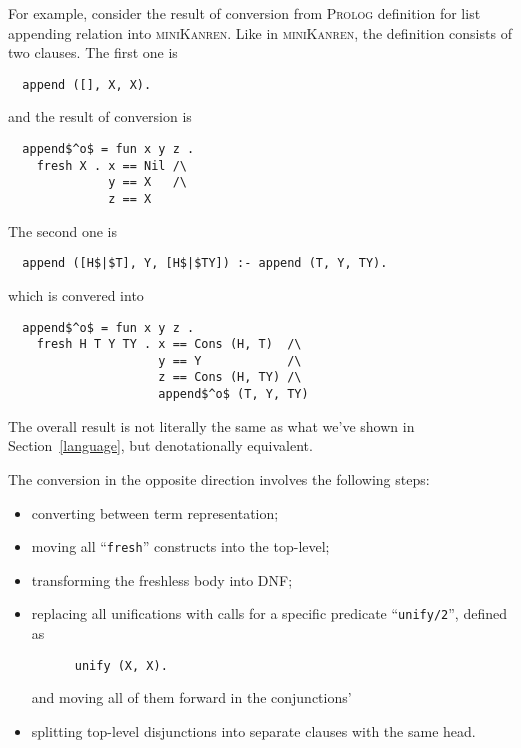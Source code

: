 For example, consider the result of conversion from \textsc{Prolog} definition for list appending relation into \textsc{miniKanren}.
Like in \textsc{miniKanren}, the definition consists of two clauses. The first one is

\begin{lstlisting}
  append ([], X, X).
\end{lstlisting}

and the result of conversion is

\begin{lstlisting}
  append$^o$ = fun x y z .
    fresh X . x == Nil /\
              y == X   /\
              z == X
\end{lstlisting}

The second one is

\begin{lstlisting}
  append ([H$|$T], Y, [H$|$TY]) :- append (T, Y, TY).
\end{lstlisting}

which is convered into

\begin{lstlisting}
  append$^o$ = fun x y z .
    fresh H T Y TY . x == Cons (H, T)  /\
                     y == Y            /\
                     z == Cons (H, TY) /\
                     append$^o$ (T, Y, TY)
\end{lstlisting}

The overall result is not literally the same as what we've shown in Section~\ref{language}, but denotationally equivalent.

The conversion in the opposite direction involves the following steps:

\begin{itemize}
  \item converting between term representation;
  \item moving all ``\lstinline|fresh|'' constructs into the top-level;
  \item transforming the freshless body into DNF;
  \item replacing all unifications with calls for a specific predicate ``\lstinline|unify/2|'', defined as

    \begin{lstlisting}
      unify (X, X).
    \end{lstlisting}
    
    and moving all of them forward in the  conjunctions'
  \item splitting top-level disjunctions into separate clauses with the same head.
\end{itemize}

